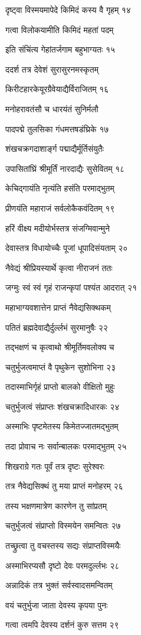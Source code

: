दृष्ट्वा विस्मयमापेदे किमिदं कस्य वै गृहम् १४

गत्वा विलोकयामीति किमिदं महतां पदम्

इति संचिंत्य गेहांतर्जगाम बहुभाग्यतः १५

ददर्श तत्र देवेशं सुरासुरनमस्कृतम्

किरीटहारकेयूरग्रैवेयाद्यैर्विराजितम् १६

मनोहरावतंसौ च धारयंतं सुनिर्मलौ

पादपद्मे तुलसिका गंधमत्तषडंघ्रिके १७

शंखचक्रगदाशार्ङ्ग पद्माद्यैर्मूर्तिसंयुतैः

उपासितांघ्रिं श्रीमूर्तिं नारदाद्यैः सुसेवितम् १८

केचिद्गायंति नृत्यंति हसंति परमाद्भुतम्

प्रीणयंति महाराजं सर्वलोकैकवंदितम् १९

हरिं वीक्ष्य मदीयोर्भस्तत्र संजग्मिवान्मुने

देवास्तत्र विधायोच्चैः पूजां धूपादिसंयताम् २०

नैवेद्यं श्रीप्रियस्यार्थे कृत्वा नीराजनं ततः

जग्मुः स्वं स्वं गृहं राजन्कृपां पश्यंत आदरात् २१

महाभाग्यवशात्तेन प्राप्तं नैवेद्यसिक्थकम्

पतितं ब्रह्मदेवाद्यैर्दुर्ल्लभं सुरमानुषैः २२

तद्भक्षणं च कृत्वाथो श्रीमूर्तिमवलोक्य च

चतुर्भुजत्वमाप्तं वै पृथुकेन सुशोभिना २३

तदास्माभिर्गृहं प्राप्तो बालको वीक्षितो मुहुः

चतुर्भुजत्वं संप्राप्तः शंखचक्रादिधारकः २४

अस्माभिः पृष्टमेतस्य किमेतज्जातमद्भुतम्

तदा प्रोवाच नः सर्वान्बालकः परमाद्भुतम् २५

शिखराग्रे गतः पूर्वं तत्र दृष्टः सुरेश्वरः

तत्र नैवेद्यसिक्थं तु मया प्राप्तं मनोहरम् २६

तस्य भक्षणमात्रेण कारणेन तु सांप्रतम्

चतुर्भुजत्वं संप्राप्तो विस्मयेन समन्वितः २७

तच्छ्रुत्वा तु वचस्तस्य सद्यः संप्राप्तविस्मयैः

अस्माभिरप्यसौ दृष्टो देवः परमदुर्ल्लभः २८

अन्नादिकं तत्र भुक्तं सर्वस्वादसमन्वितम्

वयं चतुर्भुजा जाता देवस्य कृपया पुनः

गत्वा त्वमपि देवस्य दर्शनं कुरु सत्तम २९

